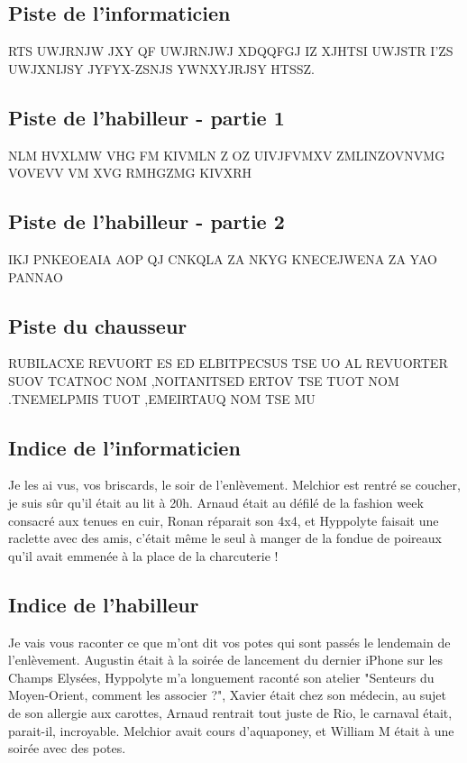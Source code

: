 \documentclass[12pt]{article}
\begin{document}
\subsection{Piste de l'informaticien}

RTS UWJRNJW JXY QF UWJRNJWJ XDQQFGJ IZ XJHTSI UWJSTR I'ZS UWJXNIJSY JYFYX-ZSNJS YWNXYJRJSY HTSSZ.


\subsection{Piste de l'habilleur - partie 1}

NLM HVXLMW VHG FM KIVMLN Z OZ UIVJFVMXV ZMLINZOVNVMG VOVEVV VM XVG RMHGZMG KIVXRH

\subsection{Piste de l'habilleur - partie 2}

IKJ PNKEOEAIA AOP QJ CNKQLA ZA NKYG KNECEJWENA ZA YAO PANNAO

\subsection{Piste du chausseur}

RUBILACXE REVUORT ES ED ELBITPECSUS TSE UO AL REVUORTER SUOV TCATNOC NOM ,NOITANITSED ERTOV TSE TUOT NOM .TNEMELPMIS TUOT ,EMEIRTAUQ NOM TSE MU



\subsection{Indice de l'informaticien}

Je les ai vus, vos briscards, le soir de l'enlèvement. Melchior est rentré se coucher, je suis sûr qu'il était au lit à 20h. Arnaud était au défilé de la fashion week consacré aux tenues en cuir, Ronan réparait son 4x4, et Hyppolyte faisait une raclette avec des amis, c'était même le seul à manger de la fondue de poireaux qu'il avait emmenée à la place de la charcuterie ! 

\subsection{Indice de l'habilleur}

Je vais vous raconter ce que m'ont dit vos potes qui sont passés le lendemain de l'enlèvement. Augustin était à la soirée de lancement du dernier iPhone sur les Champs Elysées, Hyppolyte m'a longuement raconté son atelier "Senteurs du Moyen-Orient, comment les associer ?", Xavier était chez son médecin, au sujet de son allergie aux carottes, Arnaud rentrait tout juste de Rio, le carnaval était, parait-il, incroyable. Melchior avait cours d'aquaponey, et William M était à une soirée avec des potes. 
\end{document}
